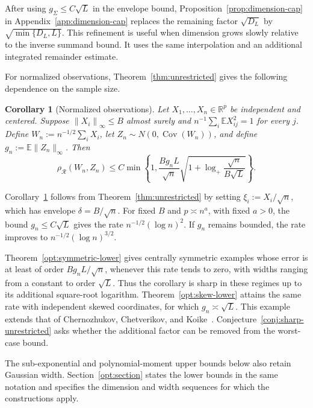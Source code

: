 \documentclass[11pt,letterpaper]{article}
\newenvironment{vSixBlock}{\color{magenta}}{}
\newtheorem{corollary}{Corollary}
\theoremstyle{remark}
\newcommand{\E}{\mathbb E}
\newcommand{\R}{\mathbb R}
\newcommand{\Cov}{\operatorname{Cov}}
\newcommand{\norm}[1]{\left\lVert#1\right\rVert}
\newcommand{\rh}{\rho_{\mathcal R}}
\begin{document}
\begin{vSixBlock}
After using \(g_\Sigma\le C\sqrt L\) in the envelope bound,
Proposition~\ref{prop:dimension-cap} in Appendix~\ref{app:dimension-cap}
replaces the remaining factor \(\sqrt{D_L}\) by
\(\sqrt{\min\{D_L,L\}}\). This refinement is useful when dimension
grows slowly relative to the inverse summand bound. It uses the same
interpolation and an additional integrated remainder estimate.
\end{vSixBlock}

For normalized observations, Theorem~\ref{thm:unrestricted} gives
the following dependence on the sample size.

\begin{corollary}[Normalized observations]\label{cor:observations}
\begin{vSixBlock}
Let \(X_1,\ldots,X_n\in\R^p\) be independent and centered. Suppose
\(\norm{X_i}_\infty\le B\) almost surely and
\(n^{-1}\sum_i\E X_{ij}^2=1\) for every \(j\). Define
\(W_n:=n^{-1/2}\sum_iX_i\), let \(Z_n\sim N(0,\Cov(W_n))\),
and define \(g_n:=\E\|Z_n\|_\infty\). Then
\begin{equation}\label{eq:observations-intrinsic}
 \rh(W_n,Z_n)\le C\min\!\left\{1,
 \frac{B g_n L}{\sqrt n}
 \sqrt{1+\log_+\frac{\sqrt n}{B\sqrt L}}\right\}.
\end{equation}
\end{vSixBlock}
\end{corollary}

\begin{vSixBlock}
Corollary~\ref{cor:observations} follows from Theorem~\ref{thm:unrestricted}
by setting \(\xi_i:=X_i/\sqrt n\), which has envelope
\(\delta=B/\sqrt n\). For fixed \(B\) and \(p\asymp n^a\), with
fixed \(a>0\), the bound \(g_n\le C\sqrt L\) gives the rate
\(n^{-1/2}(\log n)^2\). If \(g_n\) remains bounded, the rate improves
to \(n^{-1/2}(\log n)^{3/2}\).

Theorem~\ref{opt:symmetric-lower} gives centrally symmetric examples
whose error is at least of order \(B g_nL/\sqrt n\), whenever
this rate tends to zero, with widths ranging from a constant to
order \(\sqrt L\). Thus the corollary is sharp in these regimes
up to its additional square-root logarithm. Theorem~\ref{opt:skew-lower}
attains the same rate with independent skewed coordinates, for which
\(g_n\asymp\sqrt L\). This example extends that of
Chernozhukov, Chetverikov, and Koike~\cite[Proposition~2.1]{CCK}.
Conjecture~\ref{conj:sharp-unrestricted} asks whether the additional
factor can be removed from the worst-case bound.

The sub-exponential and polynomial-moment upper bounds below also
retain Gaussian width. Section~\ref{opt:section} states the lower
bounds in the same notation and specifies the dimension and width
sequences for which the constructions apply.
\end{vSixBlock}
\end{document}

